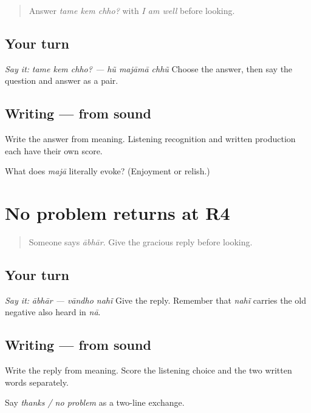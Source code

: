 \label{lesson:GU-R18-majaa-r4}



\begin{quote}
Answer \emph{tame kem chho?} with \emph{I am well} before looking.
\end{quote}

\subsection*{Your turn}
\emph{Say it:} \emph{tame kem chho? — hũ majāmā chhũ} Choose the answer, then say the question and answer as a pair.

\subsection*{Writing — from sound}
Write the answer from meaning. Listening recognition and written production each have their own score.

\begin{tcolorbox}[breakable,colback=teal!4,colframe=teal!35!black,title={Before you move on}]
What does \emph{majā} literally evoke? (Enjoyment or relish.)
\end{tcolorbox}
\section[Practice]{No problem returns at R4}

\label{lesson:GU-R18-no-problem-r4}



\begin{quote}
Someone says \emph{ābhār}. Give the gracious reply before looking.
\end{quote}

\subsection*{Your turn}
\emph{Say it:} \emph{ābhār — vāndho nahĩ} Give the reply. Remember that \emph{nahĩ} carries the old negative also heard in \emph{nā}.

\subsection*{Writing — from sound}
Write the reply from meaning. Score the listening choice and the two written words separately.

\begin{tcolorbox}[breakable,colback=teal!4,colframe=teal!35!black,title={Before you move on}]
Say \emph{thanks / no problem} as a two-line exchange.
\end{tcolorbox}
